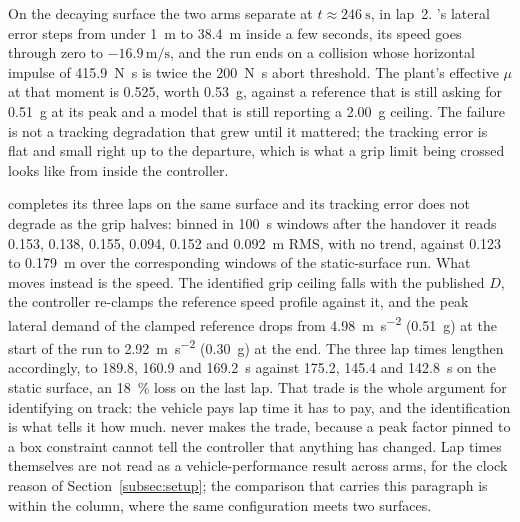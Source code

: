 On the decaying surface the two arms separate at $t\approx\SI{246}{\second}$,
in lap~2. \basearm{}'s lateral error steps from under \SI{1}{\meter} to
\SI{38.4}{\meter} inside a few seconds, its speed goes through zero to
$-16.9\,\si{\meter\per\second}$, and the run ends on a collision whose horizontal
impulse of \SI{415.9}{\newton\second} is twice the \SI{200}{\newton\second}
abort threshold. The plant's effective $\mu$ at that moment is \num{0.525},
worth \SI{0.53}{\g}, against a reference that is still asking for
\SI{0.51}{\g} at its peak and a model that is still reporting a
\SI{2.00}{\g} ceiling. The failure is not a tracking degradation that grew
until it mattered; the tracking error is flat and small right up to the
departure, which is what a grip limit being crossed looks like from inside the
controller.

\oursarm{} completes its three laps on the same surface and its tracking error
does not degrade as the grip halves: binned in \SI{100}{\second} windows after
the handover it reads \num{0.153}, \num{0.138}, \num{0.155}, \num{0.094},
\num{0.152} and \SI{0.092}{\meter} RMS, with no trend, against \num{0.123} to
\SI{0.179}{\meter} over the corresponding windows of the static-surface run.
What moves instead is the speed. The identified grip ceiling falls with the published $D$, the
controller re-clamps the reference speed profile against it, and the peak
lateral demand of the clamped reference drops from \SI{4.98}{\meter\per\second\squared}
(\SI{0.51}{\g}) at the start of the run to \SI{2.92}{\meter\per\second\squared}
(\SI{0.30}{\g}) at the end. The three lap times lengthen accordingly, to
\num{189.8}, \num{160.9} and \SI{169.2}{\second} against \num{175.2},
\num{145.4} and \SI{142.8}{\second} on the static surface, an \SI{18}{\percent}
loss on the last lap. That trade is the whole argument for identifying on
track: the vehicle pays lap time it has to pay, and the identification is what
tells it how much. \basearm{} never makes the trade, because a peak factor
pinned to a box constraint cannot tell the controller that anything has
changed. Lap times themselves are not read as a vehicle-performance result
across arms, for the clock reason of Section~\ref{subsec:setup}; the comparison
that carries this paragraph is within the \oursarm{} column, where the same
configuration meets two surfaces.

